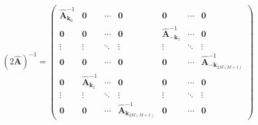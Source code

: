 \begin{equation}
(2\bm{\hat{A}})^{-1} = 
\left(\begin{array}{c|ccc|ccc}  
\bm{\hat{A}}_{\bm{k}_0}^{-1}  & \bm{0}   & \cdots    & \bm{0} & \bm{0} & \cdots  & \bm{0} \\ \hline
\bm{0}  & \bm{0}       & \cdots   & \bm{0}    & \bm{\hat{A}}_{-\bm{k}_{1}}^{-1} & \cdots  & \bm{0} \\
\vdots  &\vdots        & \ddots   & \vdots    & \vdots                  & \ddots  & \vdots \\
\bm{0}  & \bm{0}       & \cdots   & \bm{0} & \bm{0} & \cdots  & \bm{\hat{A}}_{-\bm{k}_{2M(M+1)}}^{-1}  \\ \hline
\bm{0}  & \bm{\hat{A}}_{\bm{k}_1}^{-1} & \cdots  & \bm{0} & \bm{0} & \cdots  & \bm{0} \\
\vdots  &\vdots        & \ddots   & \vdots    & \vdots                  & \ddots  & \vdots \\
\bm{0}  & \bm{0}       & \cdots   & \bm{\hat{A}}_{\bm{k}_{2M(M+1)}}^{-1}& \bm{0} & \cdots  & \bm{0} 
\end{array} \right) 
\end{equation}

